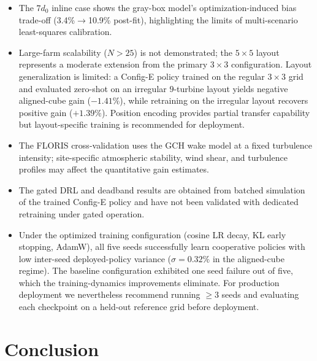 \documentclass[final,5p,times]{elsarticle}
\begin{document}
\begin{itemize}
\item The $7d_0$ inline case shows the gray-box model's optimization-induced bias trade-off (3.4\%$\rightarrow$10.9\% post-fit), highlighting the limits of multi-scenario least-squares calibration.
\item Large-farm scalability ($N>25$) is not demonstrated; the $5{\times}5$ layout represents a moderate extension from the primary $3{\times}3$ configuration. Layout generalization is limited: a Config-E policy trained on the regular $3{\times}3$ grid and evaluated zero-shot on an irregular $9$-turbine layout yields negative aligned-cube gain ($-1.41\%$), while retraining on the irregular layout recovers positive gain ($+1.39\%$). Position encoding provides partial transfer capability but layout-specific training is recommended for deployment.
\item The FLORIS cross-validation uses the GCH wake model at a fixed turbulence intensity; site-specific atmospheric stability, wind shear, and turbulence profiles may affect the quantitative gain estimates.
\item The gated DRL and deadband results are obtained from batched simulation of the trained Config-E policy and have not been validated with dedicated retraining under gated operation.
\item Under the optimized training configuration (cosine LR decay, KL early stopping, AdamW), all five seeds successfully learn cooperative policies with low inter-seed deployed-policy variance ($\sigma\!=\!0.32\%$ in the aligned-cube regime). The baseline configuration exhibited one seed failure out of five, which the training-dynamics improvements eliminate. For production deployment we nevertheless recommend running $\geq\!3$ seeds and evaluating each checkpoint on a held-out reference grid before deployment.
\end{itemize}

\section{Conclusion}\label{sec:conclusion}
\end{document}
